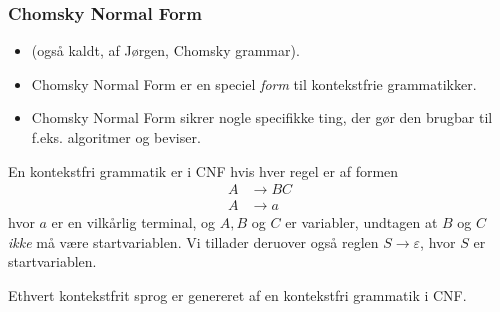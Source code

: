 \begin{frame}[allowframebreaks]
  \frametitle{Chomsky Normal Form}

  \begin{itemize}
    \item (også kaldt, af Jørgen, Chomsky grammar).
    \item Chomsky Normal Form er en speciel \textit{form} til kontekstfrie grammatikker.
    \item Chomsky Normal Form sikrer nogle specifikke ting, der gør den brugbar til f.eks. algoritmer og beviser.
  \end{itemize}

  \begin{definition}
    En kontekstfri grammatik er i CNF hvis hver regel er af formen
    \begin{align*}
      A &\rightarrow BC \\
      A &\rightarrow a
    \end{align*}
    hvor $a$ er en vilkårlig terminal, og $A, B$ og $C$ er variabler, undtagen at $B$ og $C$ \textit{ikke} må være startvariablen. Vi tillader deruover også reglen $S \rightarrow \varepsilon$, hvor $S$ er startvariablen.
  \end{definition}

  \begin{theorem}
Ethvert kontekstfrit sprog er genereret af en kontekstfri grammatik i CNF.
  \end{theorem}


\end{frame}
